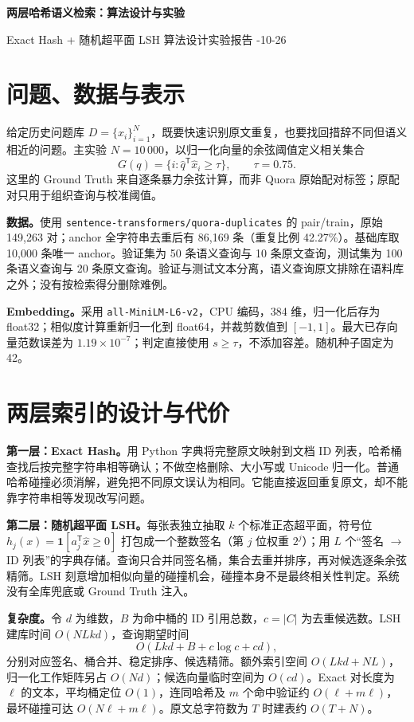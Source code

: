 \documentclass[UTF8,fontset=fandol,a4paper,10pt]{ctexart}
\begin{document}
\begin{center}
{\LARGE\bfseries 两层哈希语义检索：算法设计与实验}\par
\vspace{4pt} {\small Exact Hash + 随机超平面 LSH \quad 算法设计实验报告 -10-26}
\end{center}

\section{问题、数据与表示}
给定历史问题库 $D=\{x_i\}_{i=1}^{N}$，既要快速识别原文重复，也要找回措辞不同但语义相近的问题。主实验 $N=10\,000$，以归一化向量的余弦阈值定义相关集合
\[
 G(q)=\{i:\widehat q^{\mathsf T}\widehat x_i\ge\tau\},\qquad \tau=0.75.
\]
这里的 Ground Truth 来自逐条暴力余弦计算，而非 Quora 原始配对标签；原配对只用于组织查询与校准阈值。

\textbf{数据。}使用 \texttt{sentence-transformers/quora-duplicates} 的 pair/train，原始 149,263 对；anchor 全字符串去重后有 86,169 条（重复比例 42.27\%）。基础库取 10,000 条唯一 anchor。验证集为 50 条语义查询与 10 条原文查询，测试集为 100 条语义查询与 20 条原文查询。验证与测试文本分离，语义查询原文排除在语料库之外；没有按检索得分删除难例。

\textbf{Embedding。}采用 \texttt{all-MiniLM-L6-v2}，CPU 编码，384 维，归一化后存为 float32；相似度计算重新归一化到 float64，并裁剪数值到 $[-1,1]$。最大已存向量范数误差为 $1.19\times10^{-7}$；判定直接使用 $s\ge\tau$，不添加容差。随机种子固定为 42。

\section{两层索引的设计与代价}
\textbf{第一层：Exact Hash。}用 Python 字典将完整原文映射到文档 ID 列表，哈希桶查找后按完整字符串相等确认；不做空格删除、大小写或 Unicode 归一化。普通哈希碰撞必须消解，避免把不同原文误认为相同。它能直接返回重复原文，却不能靠字符串相等发现改写问题。

\textbf{第二层：随机超平面 LSH。}每张表独立抽取 $k$ 个标准正态超平面，符号位 $h_j(x)=\mathbf1[a_j^{\mathsf T}\widehat x\ge0]$ 打包成一个整数签名（第 $j$ 位权重 $2^j$）；用 $L$ 个“签名 $\to$ ID 列表”的字典存储。查询只合并同签名桶，集合去重并排序，再对候选逐条余弦精筛。LSH 刻意增加相似向量的碰撞机会，碰撞本身不是最终相关性判定。系统没有全库兜底或 Ground Truth 注入。

\textbf{复杂度。}令 $d$ 为维数，$B$ 为命中桶的 ID 引用总数，$c=|C|$ 为去重候选数。LSH 建库时间 $O(NLkd)$，查询期望时间
\[
 O(Lkd+B+c\log c+cd),
\]
分别对应签名、桶合并、稳定排序、候选精筛。额外索引空间 $O(Lkd+NL)$，归一化工作矩阵另占 $O(Nd)$；候选向量临时空间为 $O(cd)$。Exact 对长度为 $\ell$ 的文本，平均桶定位 $O(1)$，连同哈希及 $m$ 个命中验证约 $O(\ell+m\ell)$，最坏碰撞可达 $O(N\ell+m\ell)$。原文总字符数为 $T$ 时建表约 $O(T+N)$。
\end{document}
